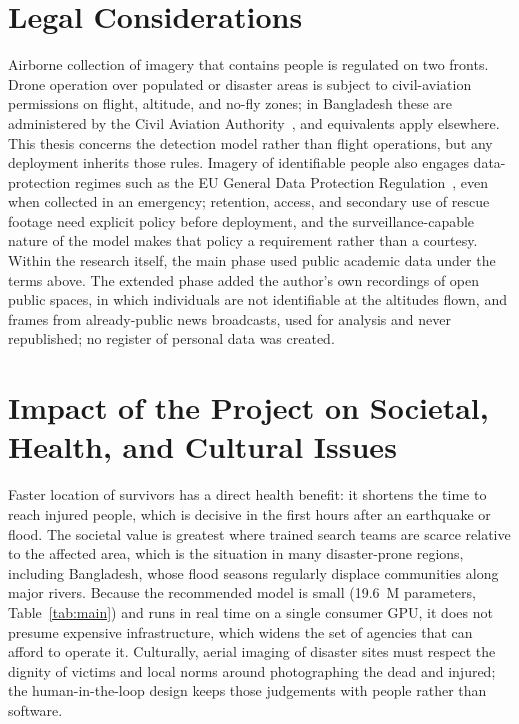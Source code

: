 \section{Legal Considerations}
\label{sec:legal5}
Airborne collection of imagery that contains people is regulated on two
fronts. Drone operation over populated or disaster areas is subject to
civil-aviation permissions on flight, altitude, and no-fly zones; in
Bangladesh these are administered by the Civil Aviation Authority~\cite{caabuav}, and
equivalents apply elsewhere. This thesis concerns the detection model rather
than flight operations, but any deployment inherits those rules. Imagery of
identifiable people also engages data-protection regimes such as the EU
General Data Protection Regulation~\cite{gdpr2016}, even when collected in
an emergency; retention, access, and secondary use of rescue footage need
explicit policy before deployment, and the surveillance-capable nature of
the model makes that policy a requirement rather than a courtesy. Within the
research itself, the main phase used public academic data under the terms
above. The extended phase added the author's own recordings of open public
spaces, in which individuals are not identifiable at the altitudes flown, and
frames from already-public news broadcasts, used for analysis and never
republished; no register of personal data was created.

\section{Impact of the Project on Societal, Health, and Cultural Issues}
Faster location of survivors has a direct health benefit: it shortens the time
to reach injured people, which is decisive in the first hours after an
earthquake or flood. The societal value is greatest where trained search teams
are scarce relative to the affected area, which is the situation in many
disaster-prone regions, including Bangladesh, whose flood seasons regularly
displace communities along major rivers. Because the recommended model is
small (19.6~M parameters, Table~\ref{tab:main}) and runs in real time on a
single consumer GPU, it does not presume expensive infrastructure, which
widens the set of agencies that can afford to operate it. Culturally, aerial
imaging of disaster sites must respect the dignity of victims and local norms
around photographing the dead and injured; the human-in-the-loop design keeps
those judgements with people rather than software.


